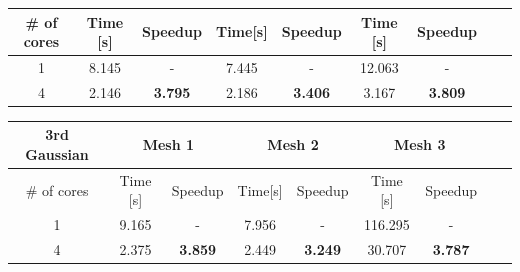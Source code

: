 \documentclass[8pt]{beamer}
\begin{document}
\begin{frame}
\begin{footnotesize}
\begin{center}
\begin{tabular}{|c|c|c|c|c|c|c|c|c|}
    \hline
    \# of cores & Time [s] & Speedup & Time[s] & Speedup & Time [s] & Speedup \\
    \hline
    1 & 8.145 & - & 7.445 & - & 12.063 & - \\
    4 & 2.146 & \textbf{3.795} & 2.186 & \textbf{3.406} & 3.167 & \textbf{3.809} \\
    \hline
\end{tabular}
\end{center}
\begin{center}
\begin{tabular}{|c|c|c|c|c|c|c|c|c|} 
   \hline
    \textbf{3rd Gaussian}& \multicolumn{2}{|c|}{Mesh 1} & \multicolumn{2}{|c|}{Mesh 2} & \multicolumn{2}{|c|}{Mesh 3}\\
    \hline
    \# of cores & Time [s] & Speedup & Time[s] & Speedup & Time [s] & Speedup \\
    \hline
    1 & 9.165 & - & 7.956 & - & 116.295 & - \\
    4 & 2.375 & \textbf{3.859} & 2.449 & \textbf{3.249} & 30.707 & \textbf{3.787} \\
    \hline
\end{tabular}
\end{center}
\end{footnotesize}
\end{frame}

\begin{frame}

\end{frame}
\end{document}

